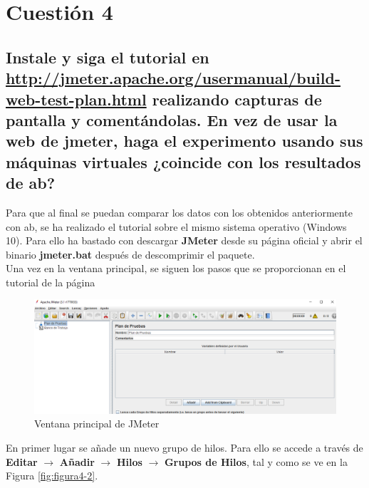 
\section{Cuestión 4}
\subsection{Instale y siga el tutorial en
	\url{http://jmeter.apache.org/usermanual/build-web-test-plan.html}
	realizando capturas de pantalla y comentándolas. En vez de usar la web de
	jmeter, haga el experimento usando sus máquinas virtuales ¿coincide con
	los resultados de ab?}

Para que al final se puedan comparar los datos con los obtenidos anteriormente con ab, se ha realizado el tutorial sobre el mismo sistema operativo (Windows 10). Para ello ha bastado con descargar \textbf{JMeter} desde su página oficial \cite{enlace7} y abrir el binario \textbf{jmeter.bat} después de descomprimir el paquete.
\\

Una vez en la ventana principal, se siguen los pasos que se proporcionan en el tutorial de la página \cite{enlace8}
\begin{figure}[H] %
	\centering
	\includegraphics[scale=0.5]{figuras/ejercicio4/figura1.png} 
	\caption{Ventana principal de JMeter} 
	\label{fig:figura4-1}
\end{figure}

En primer lugar se añade un nuevo grupo de hilos. Para ello se accede a través de \textbf{Editar} $ \rightarrow $ \textbf{Añadir} $ \rightarrow $ \textbf{Hilos} $ \rightarrow $ \textbf{Grupos de Hilos}, tal y como se ve en la Figura \ref{fig:figura4-2}.


